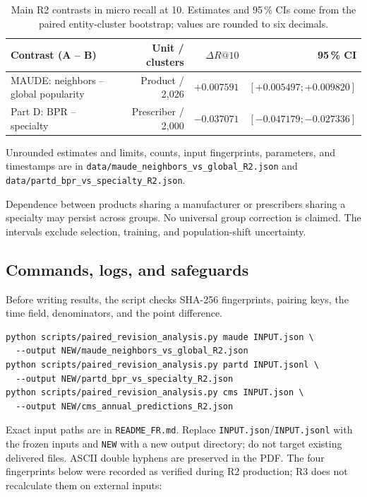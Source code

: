 \documentclass[10pt,a4paper]{article}
\newcommand{\src}[1]{{\small\nolinkurl{#1}}}
\begin{document}
\begin{table}[!htbp]\centering\small
\caption{Main R2 contrasts in micro recall at 10. Estimates and 95\,\% CIs come from the paired entity-cluster bootstrap; values are rounded to six decimals.}
\begin{tabularx}{\linewidth}{@{}Xrrr@{}}
\toprule
Contrast (A -- B) & Unit / clusters & $\Delta R@10$ & 95\,\% CI\\
\midrule
MAUDE: neighbors -- global popularity & Product / 2,026 & $+0.007591$ & $[+0.005497;+0.009820]$\\
Part D: BPR -- specialty & Prescriber / 2,000 & $-0.037071$ & $[-0.047179;-0.027336]$\\
\bottomrule
\end{tabularx}
\end{table}

Unrounded estimates and limits, counts, input fingerprints, parameters, and timestamps are in \src{data/maude_neighbors_vs_global_R2.json} and \src{data/partd_bpr_vs_specialty_R2.json}.

Dependence between products sharing a manufacturer or prescribers sharing a specialty may persist across groups. No universal group correction is claimed. The intervals exclude selection, training, and population-shift uncertainty.

\subsection{Commands, logs, and safeguards}
Before writing results, the script checks SHA-256 fingerprints, pairing keys, the time field, denominators, and the point difference.

\begin{Verbatim}[fontsize=\footnotesize]
python scripts/paired_revision_analysis.py maude INPUT.json \
  --output NEW/maude_neighbors_vs_global_R2.json
python scripts/paired_revision_analysis.py partd INPUT.jsonl \
  --output NEW/partd_bpr_vs_specialty_R2.json
python scripts/paired_revision_analysis.py cms INPUT.json \
  --output NEW/cms_annual_predictions_R2.json
\end{Verbatim}

Exact input paths are in \src{README_FR.md}. Replace \src{INPUT.json}/\src{INPUT.jsonl} with the frozen inputs and \src{NEW} with a new output directory; do not target existing delivered files. ASCII double hyphens are preserved in the PDF. The four fingerprints below were recorded as verified during R2 production; R3 does not recalculate them on external inputs:
\end{document}
